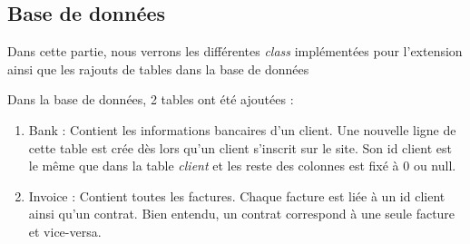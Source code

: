 \subsection{Base de données}

\begin{flushleft}
Dans cette partie, nous verrons les différentes \textit{class} implémentées pour l'extension ainsi que les rajouts de tables dans la base de données
\end{flushleft}

\begin{flushleft}
    Dans la base de données, 2 tables ont été ajoutées : 
    \begin{enumerate}
        \item Bank :\newline
        Contient les informations bancaires d'un client. Une nouvelle ligne de cette table est crée dès lors qu'un client s'inscrit sur le site. Son id client est le même que dans la table \textit{client} et les reste des colonnes est fixé à 0 ou null.
        \item Invoice :\newline
        Contient toutes les factures. Chaque facture est liée à un id client ainsi qu'un contrat. Bien entendu, un contrat correspond à une seule facture et vice-versa.
    \end{enumerate}
\end{flushleft}

